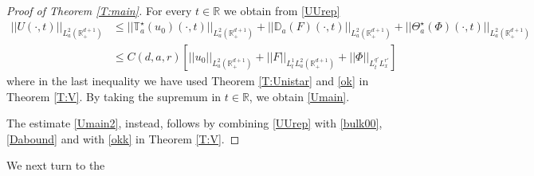 \documentclass[11pt,letter]{amsart}
\def \RN {\mathbb{R}_+^{d+1}}
\def \R {\mathbb{R}}
\numberwithin{equation}{section}
\numberwithin{equation}{section}
\begin{document}
\medskip

\begin{proof}[Proof of Theorem \ref{T:main}]
For every $t\in \R$ we obtain from \eqref{UUrep}
\begin{align*}
||U(\cdot,t)||_{L^2_a(\RN)} & \le ||\mathbb T^\star_a(u_0)(\cdot,t)||_{L^2_a(\RN)} + ||\mathbb D_a(F)(\cdot,t)||_{L^2_a(\RN)} + ||\Theta^\star_a(\Phi)(\cdot,t)||_{L^2_a(\RN)}
\\
& \le C(d,a,r)\left[||u_0||_{L^2_a(\RN)} + ||F||_{L^1_t L^2_a(\RN)} + ||\Phi||_{L^{q'}_t L^{r'}_x}\right]
\end{align*}
where in the last inequality we have used Theorem \ref{T:Unistar} and \eqref{ok} in Theorem \ref{T:V}. By taking the supremum in $t\in \R$, we obtain \eqref{Umain}. 

The estimate \eqref{Umain2}, instead, follows by combining \eqref{UUrep} with \eqref{bulk00}, \eqref{Dabound} and with \eqref{okk} in Theorem \ref{T:V}.

\end{proof}

\medskip
We next turn to the
\end{document}
